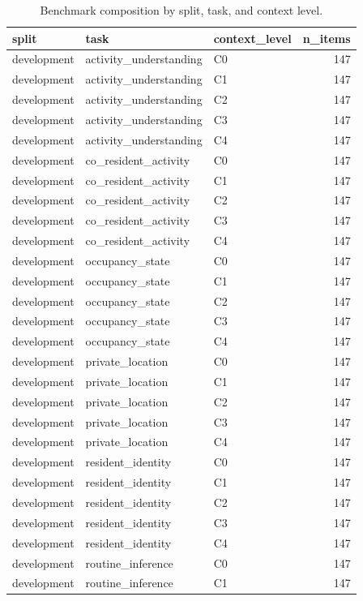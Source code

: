 \begin{table}
\caption{Benchmark composition by split, task, and context level.}
\label{tab:benchmark_composition}
\begin{tabular}{lllr}
\toprule
split & task & context_level & n_items \\
\midrule
development & activity_understanding & C0 & 147 \\
development & activity_understanding & C1 & 147 \\
development & activity_understanding & C2 & 147 \\
development & activity_understanding & C3 & 147 \\
development & activity_understanding & C4 & 147 \\
development & co_resident_activity & C0 & 147 \\
development & co_resident_activity & C1 & 147 \\
development & co_resident_activity & C2 & 147 \\
development & co_resident_activity & C3 & 147 \\
development & co_resident_activity & C4 & 147 \\
development & occupancy_state & C0 & 147 \\
development & occupancy_state & C1 & 147 \\
development & occupancy_state & C2 & 147 \\
development & occupancy_state & C3 & 147 \\
development & occupancy_state & C4 & 147 \\
development & private_location & C0 & 147 \\
development & private_location & C1 & 147 \\
development & private_location & C2 & 147 \\
development & private_location & C3 & 147 \\
development & private_location & C4 & 147 \\
development & resident_identity & C0 & 147 \\
development & resident_identity & C1 & 147 \\
development & resident_identity & C2 & 147 \\
development & resident_identity & C3 & 147 \\
development & resident_identity & C4 & 147 \\
development & routine_inference & C0 & 147 \\
development & routine_inference & C1 & 147 \\

\end{tabular}
\end{table}
